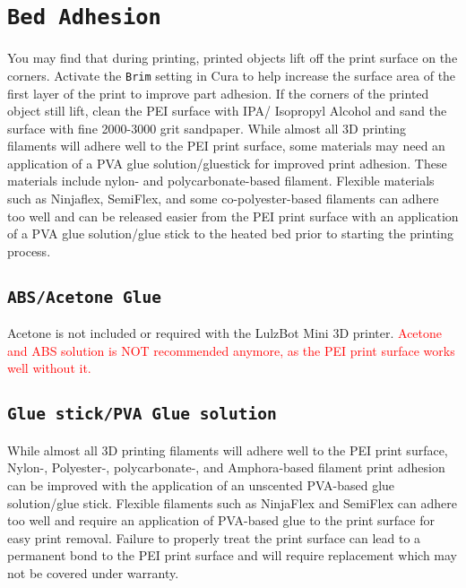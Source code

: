 \section{\texttt{Bed Adhesion}}
You may find that during printing, printed objects lift off the print surface on the corners. Activate the \texttt{Brim} setting in Cura to help increase the surface area of the first layer of the print to improve part adhesion. If the corners of the printed object still lift, clean the PEI surface with IPA/ Isopropyl Alcohol and sand the surface with fine 2000-3000 grit sandpaper. While almost all 3D printing filaments will adhere well to the PEI print surface, some materials may need an application of a PVA glue solution/gluestick for improved print adhesion. These materials include nylon- and polycarbonate-based filament. Flexible materials such as Ninjaflex, SemiFlex, and some co-polyester-based filaments can adhere too well and can be released easier from the PEI print surface with an application of a PVA glue solution/glue stick to the heated bed prior to starting the printing process.


\subsection{\texttt{ABS/Acetone Glue}}
\label{sec:ABS/Acetone Glue}

Acetone is not included or required with the LulzBot Mini 3D printer. \textcolor{red}{Acetone and ABS solution is NOT recommended anymore, as the PEI print surface works well without it.}

\subsection{\texttt{Glue stick/PVA Glue solution}}
\label{sec:Glue stick/PVA Glue solution}
While almost all 3D printing filaments will adhere well to the PEI print surface, Nylon-, Polyester-, polycarbonate-, and Amphora\textsuperscript{\miniscule{\texttrademark}}-based filament print adhesion can be improved with the application of an unscented PVA-based glue solution/glue stick. Flexible filaments such as NinjaFlex\textsuperscript{\miniscule{\textregistered}} and SemiFlex\textsuperscript{\miniscule{\texttrademark}} can adhere too well and require an application of PVA-based glue to the print surface for easy print removal. Failure to properly treat the print surface can lead to a permanent bond to the PEI print surface and will require replacement which may not be covered under warranty.


